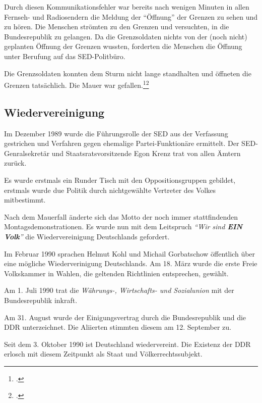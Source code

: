 \documentclass[12pt,a4paper]{article}
\begin{document}
Durch diesen Kommunikationsfehler war bereits nach wenigen Minuten in allen Fernseh- und Radiosendern die Meldung der \enquote{Öffnung} der Grenzen zu sehen und zu hören. Die Menschen strömten zu den Grenzen und versuchten, in die Bundesrepublik zu gelangen. Da die Grenzsoldaten nichts von der (noch nicht) geplanten Öffnung der Grenzen wussten, forderten die Menschen die Öffnung unter Berufung auf das SED-Politbüro.

Die Grenzsoldaten konnten dem Sturm nicht lange standhalten und öffneten die Grenzen tatsächlich. Die Mauer war gefallen.\footcite{spiegel:schabowski}\footcite{youtube:schabowski}


\subsection{Wiedervereinigung}

Im Dezember 1989 wurde die Führungsrolle der SED aus der Verfassung gestrichen und Verfahren gegen ehemalige Partei-Funktionäre ermittelt.
Der SED-Genralsekretär und Staatsratsvorsitzende Egon Krenz trat von allen Ämtern zurück.

Es wurde erstmals ein Runder Tisch mit den Oppositionsgruppen gebildet, erstmals wurde due Politik durch nichtgewählte Vertreter des Volkes mitbestimmt.

Nach dem Mauerfall änderte sich das Motto der noch immer stattfindenden Montagsdemonstrationen. Es wurde nun mit dem Leitspruch \textit{\enquote{Wir sind \bf EIN Volk}} die Wiedervereinigung Deutschlands gefordert.

Im Februar 1990 sprachen Helmut Kohl und Michail Gorbatschow öffentlich über eine mögliche Wiederverinigung Deutschlands. Am 18. März wurde die erste Freie Volkskammer in Wahlen, die geltenden Richtlinien entsprechen, gewählt.

Am 1. Juli 1990 trat die \textit{Währungs-, Wirtschafts- und Sozialunion} mit der Bundesrepublik inkraft.

Am 31. August wurde der Einigungsvertrag durch die Bundesrepublik und die DDR unterzeichnet. Die Aliierten stimmten diesem am 12. September zu.

Seit dem 3. Oktober 1990 ist Deutschland wiedervereint. Die Existenz der DDR erlosch mit diesem Zeitpunkt als Staat und Völkerrechtssubjekt.
\end{document}
